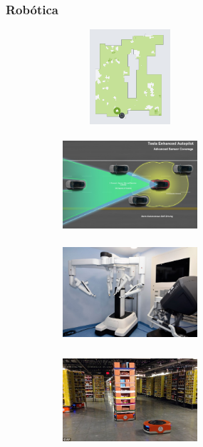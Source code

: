 \documentclass[xcolor={table}]{beamer}
\begin{document}
		
		\begin{frame}
		\frametitle{Robótica}
        \begin{figure}[H]
        \centering
        \begin{subfigure}{\textwidth}
            \includegraphics[width=5cm, height=3.5cm]{img/roomba.png}
        \label{fig:roomba}
        \end{subfigure}\hfill
        \begin{subfigure}{\textwidth}
            \includegraphics[width=5cm, height=3.5cm]{img/teslaSensors.png}
        \label{fig:tesla}
        \end{subfigure}\hfill
        \begin{subfigure}{\textwidth}
            \includegraphics[width=5cm, height=3.5cm]{img/davinci.jpg}
        \label{fig:davinci}
        \end{subfigure}\hfill
            \begin{subfigure}{\textwidth}
                \includegraphics[width=5cm, height=3.5cm]{img/robots-amazon.jpg}
            \label{fig:amazon}
            \end{subfigure}\hfill
            \label{fig:robotica}
            \end{figure}
		\end{frame}
		
\end{document}
